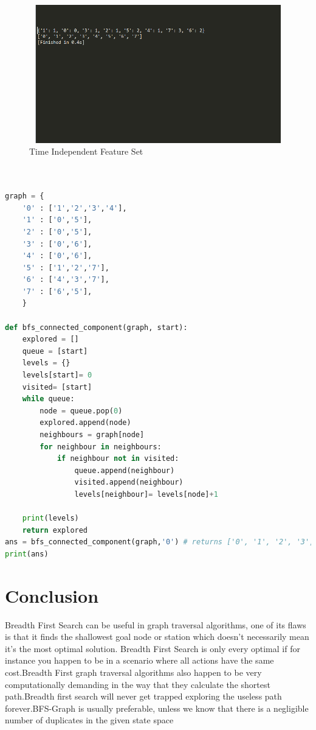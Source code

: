 \documentclass[11pt]{article}            %
\begin{document}
\begin{figure}
\centering
  \includegraphics[width=12cm,height=6cm,keepaspectratio]{1.png}
\caption{Time Independent Feature Set}
\label{Figure:3}    
\end{figure}
    

\begin{lstlisting}[language=Python]

 
graph = { 
    '0' : ['1','2','3','4'],
    '1' : ['0','5'],
    '2' : ['0','5'],
    '3' : ['0','6'],
    '4' : ['0','6'],
    '5' : ['1','2','7'],
    '6' : ['4','3','7'],
    '7' : ['6','5'],
    }

def bfs_connected_component(graph, start):
    explored = [] 
    queue = [start] 
    levels = {}        
    levels[start]= 0    
    visited= [start]    
    while queue:
        node = queue.pop(0) 
        explored.append(node)
        neighbours = graph[node]
        for neighbour in neighbours: 
            if neighbour not in visited:
                queue.append(neighbour)
                visited.append(neighbour)
                levels[neighbour]= levels[node]+1 
                
    print(levels)
    return explored
ans = bfs_connected_component(graph,'0') # returns ['0', '1', '2', '3', '4', '5', '6','7']
print(ans)
\end{lstlisting}

\section{Conclusion}  
Breadth First Search can be useful in graph traversal algorithms, one of its flaws is that it finds the shallowest goal node or station which doesn’t necessarily mean it’s the most optimal solution. Breadth First Search is only every optimal if for instance you happen to be in a scenario where all actions have the same cost.Breadth First graph traversal algorithms also happen to be very computationally demanding in the way that they calculate the shortest path.Breadth first search will never get trapped exploring the useless path forever.BFS-Graph is usually preferable, unless we know that there is a negligible number of duplicates in the given state space

 
\end{document}

